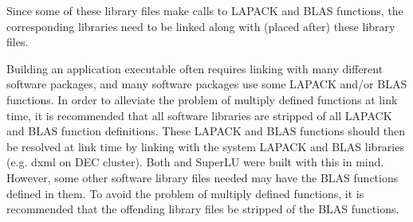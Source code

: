 Since some of these library files make calls to LAPACK and BLAS functions, 
the corresponding libraries need to be linked along with (placed after) these 
library files.  


Building an application executable often requires linking with many different
software packages, and many software packages use some LAPACK and/or BLAS
functions.  In order to alleviate the problem of multiply defined functions
at link time, it is recommended that all software libraries are stripped of
all LAPACK and BLAS function definitions.  These LAPACK and BLAS functions 
should then be resolved at link time by linking with the system LAPACK and
BLAS libraries (e.g. dxml on DEC cluster).  Both \hypre{} and SuperLU were
built with this in mind.  However, some other software library files needed
may have the BLAS functions defined in them.  To avoid the problem of
multiply defined functions, it is recommended that the offending library
files be stripped of the BLAS functions.



